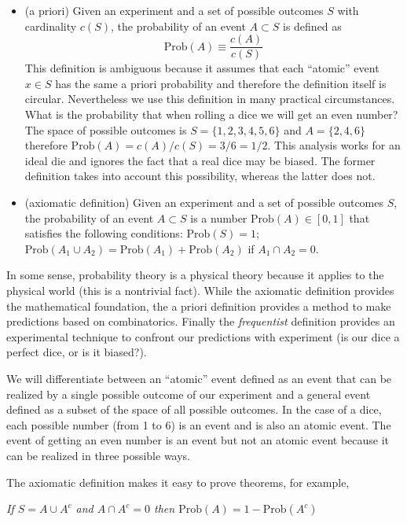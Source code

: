 \documentclass[justified, sixbynine]{tufte-book}
\theoremstyle{plain}%
\newtheorem * {corollary}{Corollary}
\theoremstyle{definition}
\theoremstyle{remark}
\newtheorem * {remark}{Remark}
\newtheorem * {note}{Note}
\begin{document}
\begin{fullwidth}
\begin{itemize}
\item  (a priori) Given an experiment and a set of possible outcomes $S$
with cardinality $c(S)$, the probability of an event $A\subset S$ is defined
as
\begin{equation}
\textrm{Prob}(A)\equiv \frac{c(A)}{c(S)}
\end{equation}
This definition is ambiguous because it assumes that each ``atomic'' event $%
x\in S$ has the same a priori probability and therefore the definition
itself is circular. Nevertheless we use this definition in many practical
circumstances. What is the probability that when rolling a dice we will get an even
number? The space of possible outcomes is $S=\{1, 2, 3, 4, 5, 6\}$ and $A=\{2, 4, 6\}
$ therefore $\textrm{Prob}(A)=c(A)/c(S)=3/6=1/2$. This analysis works for an ideal die
and ignores the fact that a real dice may be biased. The former definition
takes into account this possibility, whereas the latter does not.

\item  (axiomatic definition) Given an experiment and a set of possible
outcomes $S$, the probability of an event $A\subset S$ is a number $\textrm{Prob}(A)\in
[0, 1]$ that satisfies the following conditions: $\textrm{Prob}(S)=1$; $\textrm{Prob}(A_1\cup
A_2)=\textrm{Prob}(A_1)+\textrm{Prob}(A_2)$ if $A_1\cap A_2=0$.
\end{itemize}

In some sense, probability theory is a physical theory because it applies to
the physical world (this is a nontrivial fact). While the axiomatic
definition provides the mathematical foundation, the a priori
definition provides a method to make predictions based on combinatorics.
Finally the {\em frequentist} definition provides an experimental
technique to confront our predictions with experiment (is our dice a perfect
dice, or is it biased?).

We will differentiate between an ``atomic'' event defined as an event that
can be realized by a single possible outcome of our experiment and a general
event defined as a subset of the space of all possible outcomes. In the case
of a dice, each possible number (from 1 to 6) is an event and is also an
atomic event. The event of getting an even number is an event but not an
atomic event because it can be realized in three possible ways.

The axiomatic definition makes it easy to prove theorems, for example, 

{\it If $S=A\cup A^c$ and $A\cap A^c=0$ then $\textrm{Prob}(A)=1-\textrm{Prob}(A^c)$}


\end{fullwidth}
\end{document}
